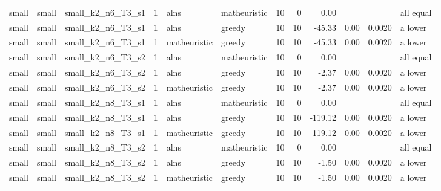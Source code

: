 \begin{tabular}{lllrllrrrrrl}
small & small & small\_k2\_n6\_T3\_s1 & 1 & alns & matheuristic & 10 & 0 & 0.00 &  &  & all equal \\
small & small & small\_k2\_n6\_T3\_s1 & 1 & alns & greedy & 10 & 10 & -45.33 & 0.00 & 0.0020 & a lower \\
small & small & small\_k2\_n6\_T3\_s1 & 1 & matheuristic & greedy & 10 & 10 & -45.33 & 0.00 & 0.0020 & a lower \\
small & small & small\_k2\_n6\_T3\_s2 & 1 & alns & matheuristic & 10 & 0 & 0.00 &  &  & all equal \\
small & small & small\_k2\_n6\_T3\_s2 & 1 & alns & greedy & 10 & 10 & -2.37 & 0.00 & 0.0020 & a lower \\
small & small & small\_k2\_n6\_T3\_s2 & 1 & matheuristic & greedy & 10 & 10 & -2.37 & 0.00 & 0.0020 & a lower \\
small & small & small\_k2\_n8\_T3\_s1 & 1 & alns & matheuristic & 10 & 0 & 0.00 &  &  & all equal \\
small & small & small\_k2\_n8\_T3\_s1 & 1 & alns & greedy & 10 & 10 & -119.12 & 0.00 & 0.0020 & a lower \\
small & small & small\_k2\_n8\_T3\_s1 & 1 & matheuristic & greedy & 10 & 10 & -119.12 & 0.00 & 0.0020 & a lower \\
small & small & small\_k2\_n8\_T3\_s2 & 1 & alns & matheuristic & 10 & 0 & 0.00 &  &  & all equal \\
small & small & small\_k2\_n8\_T3\_s2 & 1 & alns & greedy & 10 & 10 & -1.50 & 0.00 & 0.0020 & a lower \\
small & small & small\_k2\_n8\_T3\_s2 & 1 & matheuristic & greedy & 10 & 10 & -1.50 & 0.00 & 0.0020 & a lower \\
\bottomrule
\end{tabular}
